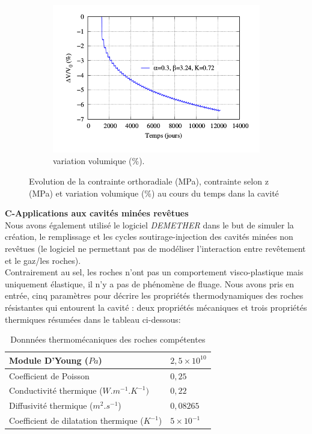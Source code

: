 \documentclass[11pt,french,a4paper]{article}
\begin{document}
\begin{figure}[h!]
\begin{subfigure}[b]{0.3\linewidth}
    \includegraphics[width=\linewidth]{image/chap2/Volume1.png}
    \caption{variation volumique (\%).}
\end{subfigure}

\caption{Evolution de la  contrainte orthoradiale (MPa), contrainte selon z (MPa) et variation volumique (\%) au cours du temps dans la cavité}
\label{fig:7 figures}
\end{figure}

\textbf{C-Applications aux cavités minées revêtues}\\

Nous avons également utilisé le logiciel \emph{DEMETHER} dans le but de simuler la création, le remplissage et les cycles soutirage-injection des cavités minées non revêtues (le logiciel ne permettant pas de modéliser l’interaction entre revêtement et le gaz/les roches).\\

Contrairement au sel, les roches n’ont pas un comportement visco-plastique mais uniquement élastique, il n’y a pas de phénomène de fluage. Nous avons pris en entrée, cinq paramètres pour décrire les propriétés thermodynamiques des roches résistantes qui entourent la cavité : deux propriétés mécaniques et trois propriétés thermiques résumées dans le tableau ci-dessous:\\


\begin{table}[h]
\centering
\begin{tabular}{|l|l|}
\hline
Module D'Young ($Pa$) & $2,5\times 10^{10}$ \\
\hline
Coefficient de Poisson & $0,25$ \\
\hline
Conductivité thermique ($W.m^{-1}.K^{-1})$ & $0,22$ \\
\hline
Diffusivité thermique ($m^2.s^{-1}$) & $0,08265$ \\
\hline
Coefficient de dilatation thermique ($K^{-1}$) & $5\times 10^{-1}$ \\
\hline
\end{tabular}
\caption{Donnnées thermomécaniques des roches compétentes}
\end{table}
\end{document}
